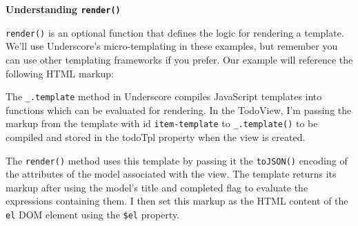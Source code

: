 \documentclass[9pt]{book}
\newenvironment{Shaded}{}{}
\newcommand{\KeywordTok}[1]{\textcolor[rgb]{0.00,0.44,0.13}{\textbf{{#1}}}}
\newcommand{\StringTok}[1]{\textcolor[rgb]{0.25,0.44,0.63}{{#1}}}
\newcommand{\OtherTok}[1]{\textcolor[rgb]{0.00,0.44,0.13}{{#1}}}
\newcommand{\ErrorTok}[1]{\textcolor[rgb]{1.00,0.00,0.00}{\textbf{{#1}}}}
\newcommand{\NormalTok}[1]{{#1}}
\begin{document}
\textbf{Understanding \texttt{render()}}

\texttt{render()} is an optional function that defines the logic for
rendering a template. We'll use Underscore's micro-templating in these
examples, but remember you can use other templating frameworks if you
prefer. Our example will reference the following HTML markup:

\begin{Shaded}
\end{Shaded}

The \texttt{\_.template} method in Underscore compiles JavaScript
templates into functions which can be evaluated for rendering. In the
TodoView, I'm passing the markup from the template with id
\texttt{item-template} to \texttt{\_.template()} to be compiled and
stored in the todoTpl property when the view is created.

The \texttt{render()} method uses this template by passing it the
\texttt{toJSON()} encoding of the attributes of the model associated
with the view. The template returns its markup after using the model's
title and completed flag to evaluate the expressions containing them. I
then set this markup as the HTML content of the \texttt{el} DOM element
using the \texttt{\$el} property.
\end{document}
